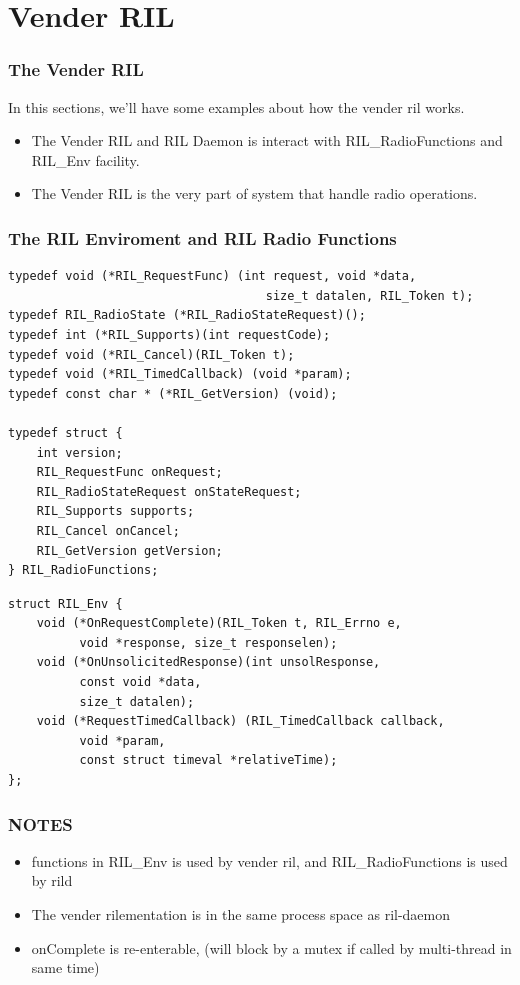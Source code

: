 \documentclass{beamer}
\begin{document}
\section{Vender RIL}
\begin{frame}
    \frametitle{The Vender RIL}
    In this sections, we'll have some examples about how the vender ril works.
    \begin{itemize}
        \item The Vender RIL and RIL Daemon is interact with RIL\_RadioFunctions and RIL\_Env facility.
        \item The Vender RIL is the very part of system that handle radio operations.
    \end{itemize}
\end{frame}

\begin{frame}[fragile]
    \frametitle{The RIL Enviroment and RIL Radio Functions}
     \lstset{language=C}
  \begin{lstlisting}
typedef void (*RIL_RequestFunc) (int request, void *data,
                                    size_t datalen, RIL_Token t);
typedef RIL_RadioState (*RIL_RadioStateRequest)();
typedef int (*RIL_Supports)(int requestCode);
typedef void (*RIL_Cancel)(RIL_Token t);
typedef void (*RIL_TimedCallback) (void *param);
typedef const char * (*RIL_GetVersion) (void);

typedef struct {
    int version;        
    RIL_RequestFunc onRequest;
    RIL_RadioStateRequest onStateRequest;
    RIL_Supports supports;
    RIL_Cancel onCancel;
    RIL_GetVersion getVersion;
} RIL_RadioFunctions;
  \end{lstlisting}
     \lstset{language=C}
  \begin{lstlisting}
struct RIL_Env {
    void (*OnRequestComplete)(RIL_Token t, RIL_Errno e,
          void *response, size_t responselen);
    void (*OnUnsolicitedResponse)(int unsolResponse,
          const void *data,
          size_t datalen);
    void (*RequestTimedCallback) (RIL_TimedCallback callback,
          void *param, 
          const struct timeval *relativeTime);
};
  \end{lstlisting}
\end{frame}
\begin{frame}
    \frametitle{NOTES}
    \begin{itemize}
        \item functions in RIL\_Env is used by vender ril, and RIL\_RadioFunctions is used by rild
        \item The vender rilementation is in the same process space as ril-daemon
        \item onComplete is re-enterable, (will block by a mutex if called by multi-thread in same time)
    \end{itemize}
\end{frame}
\end{document}
